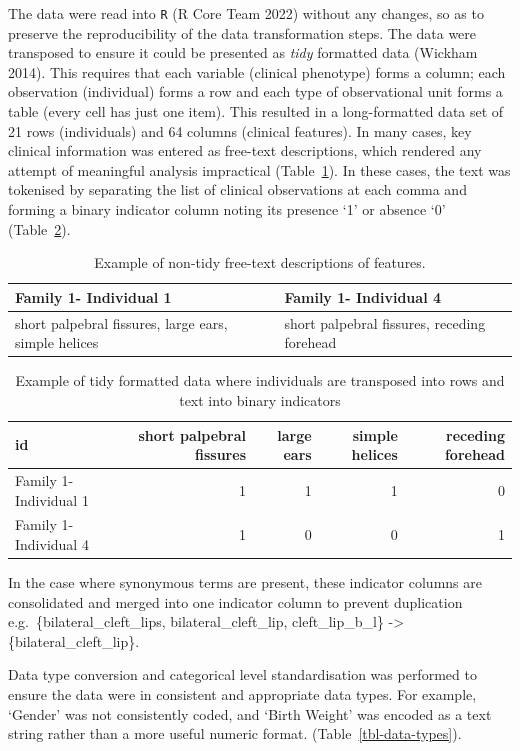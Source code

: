 \documentclass[
  letterpaper,
  DIV=11,
  numbers=noendperiod]{scrartcl}
\begin{document}
The data were read into \texttt{R} (R Core Team 2022) without any
changes, so as to preserve the reproducibility of the data
transformation steps. The data were transposed to ensure it could be
presented as \emph{tidy} formatted data (Wickham 2014). This requires
that each variable (clinical phenotype) forms a column; each observation
(individual) forms a row and each type of observational unit forms a
table (every cell has just one item). This resulted in a long-formatted
data set of 21 rows (individuals) and 64 columns (clinical features). In
many cases, key clinical information was entered as free-text
descriptions, which rendered any attempt of meaningful analysis
impractical (Table~\ref{tbl-nontidy}). In these cases, the text was
tokenised by separating the list of clinical observations at each comma
and forming a binary indicator column noting its presence `1' or absence
`0' (Table~\ref{tbl-tidy}).

\hypertarget{tbl-nontidy}{}
\begin{longtable}{ll}
\caption{\label{tbl-nontidy}Example of non-tidy free-text descriptions of features. }\tabularnewline

\toprule
Family 1- Individual 1 & Family 1- Individual 4  \\ 
\midrule
short palpebral fissures, large ears, simple helices & short palpebral fissures, receding forehead \\ 
\bottomrule
\end{longtable}

\hypertarget{tbl-tidy}{}
\begin{longtable}{lrrrr}
\caption{\label{tbl-tidy}Example of tidy formatted data where individuals are transposed into
rows and text into binary indicators }\tabularnewline

\toprule
id & short palpebral fissures & large ears & simple helices & receding forehead \\ 
\midrule
Family 1- Individual 1 & 1 & 1 & 1 & 0 \\ 
Family 1- Individual 4 & 1 & 0 & 0 & 1 \\ 
\bottomrule
\end{longtable}

In the case where synonymous terms are present, these indicator columns
are consolidated and merged into one indicator column to prevent
duplication e.g.~\{bilateral\_cleft\_lips, bilateral\_cleft\_lip,
cleft\_lip\_b\_l\} -\textgreater{} \{bilateral\_cleft\_lip\}.

Data type conversion and categorical level standardisation was performed
to ensure the data were in consistent and appropriate data types. For
example, `Gender' was not consistently coded, and `Birth Weight' was
encoded as a text string rather than a more useful numeric format.
(Table~\ref{tbl-data-types}).
\end{document}
